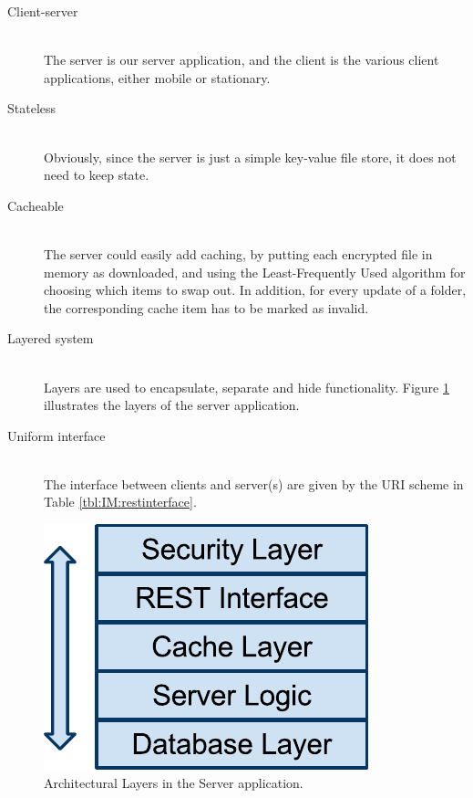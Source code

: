 \documentclass[pdftex,english,10pt,b5paper,twoside]{book}
\begin{document}
\begin{description}
  \item[Client-server] \hfill \\
    The server is our server application, and the client is the various client
    applications, either mobile or stationary.
  
  \item[Stateless] \hfill \\
    Obviously, since the server is just a simple key-value file store, it does
    not need to keep state.

  \item[Cacheable] \hfill \\
    The server could easily add caching, by putting each encrypted file in
    memory as downloaded, and using the Least-Frequently Used algorithm for
    choosing which items to swap out. In addition, for every update of a folder,
    the corresponding cache item has to be marked as invalid.

  \item[Layered system] \hfill \\
    Layers are used to encapsulate, separate and hide functionality.
    Figure \ref{fig:IM:layers} illustrates the layers of the server application.

  \item[Uniform interface] \hfill \\
    The interface between clients and server(s) are given by the URI scheme in
    Table \ref{tbl:IM:restinterface}.

\end{description}

\begin{figure}[h!]
    \centering
    \includegraphics[scale=0.6]{ImplementationServerLayers.pdf}
    \caption{Architectural Layers in the Server application.}
    \label{fig:IM:layers}
\end{figure}
\end{document}
